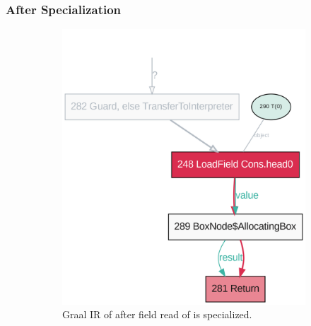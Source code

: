 \subsubsection*{After Specialization}
\begin{figure}[!htb]
	\centering
	\begin{subfigure}[b]{0.4\textwidth}
		\centering
		\includegraphics[width=\textwidth]{figures/dot/List.head.specialized.TruffleTier.png}
		\caption{Graal IR of  after field read of  is specialized.}
		\label{graalir:cons-head-specialized}
	\end{subfigure}
	\hfill
	\begin{subfigure}[b]{0.4\textwidth}
		\centering

\end{subfigure}
\end{figure}

